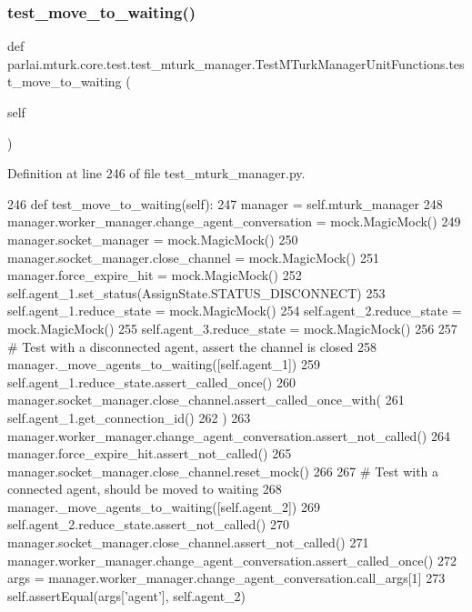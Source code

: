 \subsubsection{\texorpdfstring{test\+\_\+move\+\_\+to\+\_\+waiting()}{test\_move\_to\_waiting()}}
{\footnotesize\ttfamily def parlai.\+mturk.\+core.\+test.\+test\+\_\+mturk\+\_\+manager.\+Test\+M\+Turk\+Manager\+Unit\+Functions.\+test\+\_\+move\+\_\+to\+\_\+waiting (\begin{DoxyParamCaption}\item[{}]{self }\end{DoxyParamCaption})}



Definition at line 246 of file test\+\_\+mturk\+\_\+manager.\+py.


\begin{DoxyCode}
246     \textcolor{keyword}{def }test\_move\_to\_waiting(self):
247         manager = self.mturk\_manager
248         manager.worker\_manager.change\_agent\_conversation = mock.MagicMock()
249         manager.socket\_manager = mock.MagicMock()
250         manager.socket\_manager.close\_channel = mock.MagicMock()
251         manager.force\_expire\_hit = mock.MagicMock()
252         self.agent\_1.set\_status(AssignState.STATUS\_DISCONNECT)
253         self.agent\_1.reduce\_state = mock.MagicMock()
254         self.agent\_2.reduce\_state = mock.MagicMock()
255         self.agent\_3.reduce\_state = mock.MagicMock()
256 
257         \textcolor{comment}{# Test with a disconnected agent, assert the channel is closed}
258         manager.\_move\_agents\_to\_waiting([self.agent\_1])
259         self.agent\_1.reduce\_state.assert\_called\_once()
260         manager.socket\_manager.close\_channel.assert\_called\_once\_with(
261             self.agent\_1.get\_connection\_id()
262         )
263         manager.worker\_manager.change\_agent\_conversation.assert\_not\_called()
264         manager.force\_expire\_hit.assert\_not\_called()
265         manager.socket\_manager.close\_channel.reset\_mock()
266 
267         \textcolor{comment}{# Test with a connected agent, should be moved to waiting}
268         manager.\_move\_agents\_to\_waiting([self.agent\_2])
269         self.agent\_2.reduce\_state.assert\_not\_called()
270         manager.socket\_manager.close\_channel.assert\_not\_called()
271         manager.worker\_manager.change\_agent\_conversation.assert\_called\_once()
272         args = manager.worker\_manager.change\_agent\_conversation.call\_args[1]
273         self.assertEqual(args[\textcolor{stringliteral}{'agent'}], self.agent\_2)

\end{DoxyCode}
